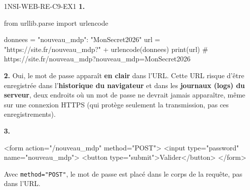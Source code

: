\begin{corrige}{1NSI-WEB-RE-C9-EX1}
\textbf{1.}
\begin{python}
from urllib.parse import urlencode

donnees = {"nouveau_mdp": "MonSecret2026"}
url = "https://site.fr/nouveau_mdp?" + urlencode(donnees)
print(url)
# https://site.fr/nouveau_mdp?nouveau_mdp=MonSecret2026
\end{python}

\textbf{2.} Oui, le mot de passe apparaît \textbf{en clair} dans l'URL. Cette URL risque
d'être enregistrée dans l'\textbf{historique du navigateur} et dans les
\textbf{journaux (logs) du serveur}, deux endroits où un mot de passe ne devrait jamais
apparaître, même sur une connexion HTTPS (qui protège seulement la transmission, pas ces
enregistrements).

\textbf{3.}
\begin{console}
<form action="/nouveau_mdp" method="POST">
    <input type="password" name="nouveau_mdp">
    <button type="submit">Valider</button>
</form>
\end{console}
Avec \lstinline{method="POST"}, le mot de passe est placé dans le corps de la requête, pas
dans l'URL.
\end{corrige}
